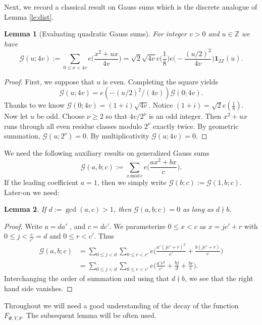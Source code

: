 \documentclass[12pt,reqno]{amsart}
\theoremstyle{plain}
\newtheorem{lemma}{Lemma}
\numberwithin{equation}{section}
\numberwithin{figure}{section}
\theoremstyle{plain}
\theoremstyle{definition}
\theoremstyle{remark}
\begin{document}
Next, we record a classical result on Gauss sums
which is the discrete analogue of Lemma \ref{le:dist}. 
\begin{lemma}[Evaluating quadratic Gauss sums]\label{le:quadratic Gauss sums}
  For integer $v > 0$ and $u \in \mathbb{Z}$ we have
  \[ 
\mathcal{G}(u; 4v) := \sum_{0\leq x <4v} 
e \Big ( \frac{x^2+ux}{4v}\Big) = 
 \sqrt{2} \sqrt{4 v} e \Big ( \frac{1}{8} \Big ) 
 e \Big ( - \frac{(u/2)^2}{4 v} \Big ) \mathbf{1}_{2\mathbb{Z}}(u).
\]
\end{lemma}
\begin{proof}
First, we suppose that $u$ is even. 
Completing the square yields
$$\mathcal{G}(u; 4v) = e (-(u/2)^2/(4 v)) \mathcal{G}(0; 4v).$$
Thanks to \cite[Theorem 3.4]{IwaniecKowalski} we know
$\mathcal{G}(0; 4v)=(1 + i) \sqrt{4v}$.
Notice $(1 + i) = \sqrt{2} e(\tfrac 18)$.
Now let $u$ be odd. Choose $\nu \geq 2$ 
so that $4v/2^{\nu}$ is an odd integer.
Then $x^2+ux$ runs through all even residue classes modulo $2^\nu$ exactly twice. By geometric summation,
$\mathcal{G}(u; 2^\nu) =0$.
By multiplicativity 
$\mathcal{G}(u; 4v) =0$.
\end{proof}



We need the following auxiliary results on generalized Gauss sums
\[
\mathcal{G}(a,b;c):=\sum_{x\,\mathrm{mod}\,c}e \Big (\frac{ax^{2}+bx}{c} \Big ).
\]
If the leading coefficient $a=1$, then we simply write $\mathcal{G}(b;c):=\mathcal{G}(1,b;c)$.
Later-on we need:
\begin{lemma}\label{le:Gauss sums vanish}
If $d:=\gcd(a,c)>1$, then $\mathcal{G}(a,b;c)=0$ as long as $d\nmid b$.
\end{lemma}
\begin{proof}
Write $a=da'$ , and $c=dc'$. We parameterize $0\leq x<c$ as $x=jc'+r$
with $0\leq j<\frac{c}{c'}=d$ and $0\leq r<c'$. Thus 
\begin{align*}
\mathcal{G}(a,b;c) & =\sum_{0\leq j<d}\sum_{0\leq r<c'}e \Big (\frac{a'(jc'+r)^{2}}{c'}+\frac{b (j c' + r)}{c} \Big )\\
 & =\sum_{0\leq j<d}\sum_{0\leq r<c'}e \Big (\frac{a'r^{2}}{c'}+\frac{b j}{d}+\frac{b r}{c}\Big ).
\end{align*}
Interchanging the order of summation and using that $d\nmid b$, we
see that the right hand side vanishes.
\end{proof}

Throughout we will need a good understanding of the decay of the function $F_{\Phi, V, \theta}$. The subsequent lemma will be often used. 
\end{document}
